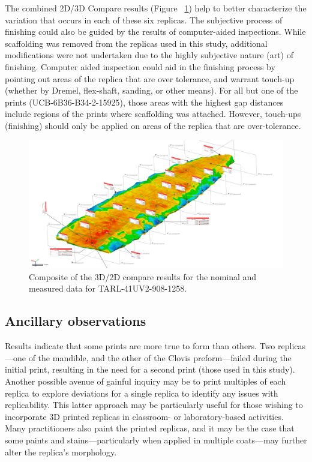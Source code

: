 \documentclass[review]{elsarticle}
\begin{document}
The combined 2D/3D Compare results (Figure ~\ref{fig:Fig3DCompare}) help to better characterize the variation that occurs in each of these six replicas. The subjective process of finishing could also be guided by the results of computer-aided inspections. While scaffolding was removed from the replicas used in this study, additional modifications were not undertaken due to the highly subjective nature (art) of finishing. Computer aided inspection could aid in the finishing process by pointing out areas of the replica that are over tolerance, and warrant touch-up (whether by Dremel, flex-shaft, sanding, or other means). For all but one of the prints (UCB-6B36-B34-2-15925), those areas with the highest gap distances include regions of the prints where scaffolding was attached. However, touch-ups (finishing) should only be applied on areas of the replica that are over-tolerance. 

\begin{figure}[ht]\centering
\includegraphics[width=\linewidth]{Fig3DCompare}
\caption{Composite of the 3D/2D compare results for the nominal and measured data for TARL-41UV2-908-1258.}
\label{fig:Fig3DCompare}
\end{figure}

\subsection*{Ancillary observations}

Results indicate that some prints are more true to form than others. Two replicas---one of the mandible, and the other of the Clovis preform---failed during the initial print, resulting in the need for a second print (those used in this study). Another possible avenue of gainful inquiry may be to print multiples of each replica to explore deviations for a single replica to identify any issues with replicability. This latter approach may be particularly useful for those wishing to incorporate 3D printed replicas in classroom- or laboratory-based activities. Many practitioners also paint the printed replicas, and it may be the case that some paints and stains---particularly when applied in multiple coats---may further alter the replica's morphology.
\end{document}
